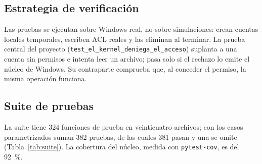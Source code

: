 \documentclass[conference]{IEEEtran}
\begin{document}
\subsection{Estrategia de verificación}
Las pruebas se ejecutan sobre Windows real, no sobre simulaciones: crean cuentas locales temporales, escriben ACL reales y las eliminan al terminar. La prueba central del proyecto (\texttt{test\_el\_kernel\_deniega\_el\_acceso}) suplanta a una cuenta sin permisos e intenta leer un archivo; pasa solo si el rechazo lo emite el núcleo de Windows. Su contraparte comprueba que, al conceder el permiso, la misma operación funciona.

\subsection{Suite de pruebas}
La suite tiene 324 funciones de prueba en veinticuatro archivos; con los casos parametrizados suman 382 pruebas, de las cuales 381 pasan y una se omite (Tabla~\ref{tab:suite}). La cobertura del núcleo, medida con \texttt{pytest-cov}, es del 92~\%.
\end{document}
